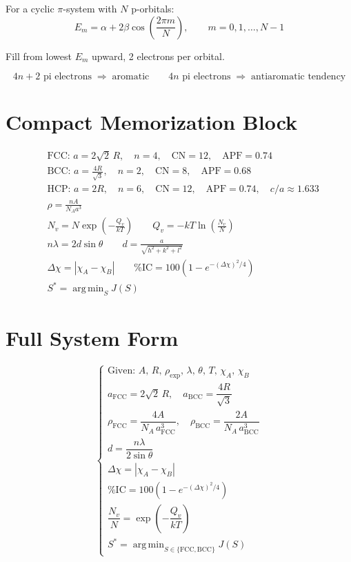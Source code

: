 \documentclass[11pt, letterpaper]{article}
\newcommand{\NA}{N_{\!A}}
\newcommand{\Qv}{Q_v}
\newcommand{\Nv}{N_v}
\newcommand{\argmin}{\operatorname{arg\,min}}
\begin{document}
For a cyclic $\pi$-system with $N$ p-orbitals:
\[
E_m = \alpha + 2\beta\cos\!\left(\frac{2\pi m}{N}\right),
\qquad m = 0, 1, \ldots, N-1
\]

Fill from lowest $E_m$ upward, 2 electrons per orbital.

\[
4n+2 \text{ pi electrons} \;\Rightarrow\; \text{aromatic}
\qquad
4n \text{ pi electrons} \;\Rightarrow\; \text{antiaromatic tendency}
\]

\section{Compact Memorization Block}

\begin{align*}
&\text{FCC: } a=2\sqrt{2}\,R,\quad n=4,\quad \mathrm{CN}=12,\quad \mathrm{APF}=0.74 \\
&\text{BCC: } a=\tfrac{4R}{\sqrt{3}},\quad n=2,\quad \mathrm{CN}=8,\quad \mathrm{APF}=0.68 \\
&\text{HCP: } a=2R,\quad n=6,\quad \mathrm{CN}=12,\quad \mathrm{APF}=0.74,\quad c/a\approx1.633 \\[4pt]
&\rho = \frac{nA}{\NA a^3} \\[4pt]
&\Nv = N\exp\!\left(-\frac{\Qv}{kT}\right)
\qquad
\Qv = -kT\ln\!\left(\frac{\Nv}{N}\right) \\[4pt]
&n\lambda = 2d\sin\theta
\qquad
d = \frac{a}{\sqrt{h^2+k^2+l^2}} \\[4pt]
&\Delta\chi = |\chi_A - \chi_B|
\qquad
\text{\%IC} = 100\!\left(1-e^{-(\Delta\chi)^2/4}\right) \\[4pt]
&S^* = \argmin_S J(S)
\end{align*}

\section{Full System Form}

\[
\begin{cases}
  \text{Given: } A,\,R,\,\rho_{\exp},\,\lambda,\,\theta,\,T,\,\chi_A,\,\chi_B \\[4pt]
  a_{\mathrm{FCC}} = 2\sqrt{2}\,R,\quad a_{\mathrm{BCC}} = \dfrac{4R}{\sqrt{3}} \\[6pt]
  \rho_{\mathrm{FCC}} = \dfrac{4A}{\NA\, a_{\mathrm{FCC}}^3},\quad
  \rho_{\mathrm{BCC}} = \dfrac{2A}{\NA\, a_{\mathrm{BCC}}^3} \\[6pt]
  d = \dfrac{n\lambda}{2\sin\theta} \\[6pt]
  \Delta\chi = |\chi_A - \chi_B| \\[4pt]
  \text{\%IC} = 100\!\left(1 - e^{-(\Delta\chi)^2/4}\right) \\[4pt]
  \dfrac{\Nv}{N} = \exp\!\left(-\dfrac{\Qv}{kT}\right) \\[6pt]
  S^* = \displaystyle\argmin_{S\in\{\text{FCC},\text{BCC}\}} J(S)
\end{cases}
\]
\end{document}
